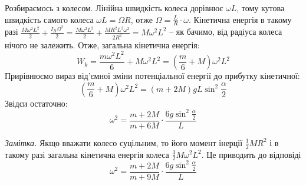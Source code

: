 \documentclass[14pt]{extarticle}
\begin{document}
Розбираємось з колесом. Лінійна швидкість колеса дорівнює $\omega L$, тому кутова швидкість самого колеса $\omega L = \Omega R$, отже $\Omega = \frac{L}{R}\cdot \omega$. Кінетична енергія в такому разі $\frac{M\omega^2L^2}{2}+\frac{I_B\Omega^2}{2} = \frac{M\omega^2L^2}{2}+\frac{MR^2L^2\omega^2}{2R^2}=M\omega^2L^2$ -- як бачимо, від радіуса колеса нічого не залежить. Отже, загальна кінетична енергія:
\[
W_k = \frac{m\omega^2 L^2}{6} + M\omega^2 L^2 = \left(\frac{m}{6} + M\right)\omega^2L^2
\]
Прирівнюємо вираз від'ємної зміни потенціальної енергії до прибутку кінетичної:
\[
\left(\frac{m}{6}+M\right)\omega^2 L^2 = (m+2M)gL \sin^2 \frac{\alpha}{2}
\]
Звідси остаточно:
\[
\boxed{\omega^2 = \frac{m+2M}{m+6M} \cdot \frac{6g\sin^2\frac{\alpha}{2}}{L}}
\]

\textit{Замітка.} Якщо вважати колесо суцільним, то його момент інерції $\frac{1}{2}MR^2$ і в такому разі загальна кінетична енергія колеса $\frac{3}{2}M\omega^2 L^2$. Це приводить до відповіді
\[
\omega^2 = \frac{m+2M}{m+9M} \cdot \frac{6g\sin^2\frac{\alpha}{2}}{L}
\]
\end{document}
